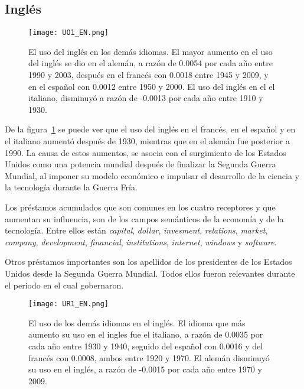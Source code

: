 \subsection{Inglés} %

\begin{figure}[h!]
	\centering
	\texttt{[image: UO1\_EN.png]}
	\caption{El uso del inglés en los demás idiomas. El mayor aumento en el uso del inglés se dio en el alemán, a razón de 0.0054 por cada año entre 1990 y 2003, después en el francés con 0.0018 entre 1945 y 2009, y en el español con 0.0012 entre 1950 y 2000. El uso del inglés en el el italiano, disminuyó a razón de -0.0013 por cada año entre 1910 y 1930.}
	\label{fig.UO_EN}
\end{figure} 


De la figura~\ref{fig.UO_EN} se puede ver que el uso del inglés en el francés, en el español y en el italiano aumentó después de 1930, mientras que en el alemán fue posterior a 1990.  La causa de estos aumentos, se asocia con el surgimiento de los Estados Unidos como una potencia mundial después de finalizar la Segunda Guerra Mundial,  al  imponer  su modelo económico e impulsar el desarrollo de la ciencia y la tecnología durante la Guerra Fría.

Los préstamos acumulados que son comunes en los cuatro receptores y que aumentan su influencia, son de los campos semánticos de la economía y de la tecnología. Entre ellos están \textit{capital}, \textit{dollar}, \textit{invesment}, \textit{relations}, \textit{market}, \textit{company}, \textit{development}, \textit{financial},  \textit{institutions}, \textit{internet}, \textit{windows} y \textit{software}. 
\label{EN-D}

Otros préstamos importantes son los apellidos de los presidentes de los Estados Unidos desde la Segunda Guerra Mundial. Todos ellos fueron relevantes durante el periodo en el cual gobernaron. 


\begin{figure}[h!]
	\centering
	\texttt{[image: UR1\_EN.png]}
	\caption{El uso de los demás idiomas en el inglés. El idioma que más aumento su uso en el ingles fue el italiano, a razón de 0.0035  por cada año entre 1930 y 1940, seguido del español con 0.0016 y del francés con 0.0008, ambos entre 1920 y 1970. El alemán disminuyó su uso en el inglés, a razón de -0.0015 por cada año entre 1970 y 2009.}
	\label{fig.UR_EN}
\end{figure} 


